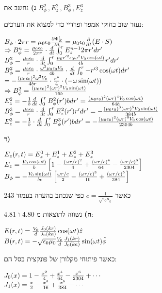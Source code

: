 \documentclass[14pt]{extarticle}
\makeatletter
\newenvironment{lefteqs}{%
    \begin{english}%
    \begin{flushleft}%
    \renewcommand{\arraystretch}{1.3}%
    $\begin{array}{@{}l@{}}%
}{%
    \end{array}$%
    \end{flushleft}%
    \end{english}%
}
\makeatother
\begin{document}
\textbf{ג)} 
נחשב את $B_\phi^2 \, , E_z^2 \, , B_\phi^3 \, , E_z^3$

נעזר שוב בחוקי אמפר ופרדיי כדי למצוא את הערכים:

\begin{lefteqs}
    B_\phi \cdot 2\pi r = \mu_0 \epsilon_0 \frac{\partial \Phi_E^1}{\partial t} = \mu_0 \epsilon_0 \frac{\partial}{\partial  t} (E \cdot S) \\
    \Rightarrow B_\phi^n = \frac{\mu_0 \epsilon_0}{2\pi r} \cdot \frac{d}{dt} \int_0^r E_z^{n-1} 2\pi r' dr' \\
    B_\phi^2 = \frac{\mu_0 \epsilon_0}{r} \cdot \frac{d}{dt} \int_0^r \frac{\mu_0 r'^2 \epsilon_0 \omega^2 V_0 \cos(\omega t)}{4b} r' dr' \\
    B_\phi^2 = \frac{\mu_0 \epsilon_0}{r} \cdot \frac{\omega^2 \mu_0 \epsilon_0 V_0}{4b} \cdot \frac{d}{dt} \int_0^r -r'^3 \cos(\omega t) dr' \\
    = -\frac{(\mu_0 \epsilon_0)^2 \omega^2 V_0}{4b r} \cdot \frac{r^4}{4} \cdot (-\omega \sin(\omega t)) \\
    \Rightarrow B_\phi^2 =\frac{(\mu_0 \epsilon_0)^2 (\omega r)^3 V_0 \sin(\omega t)}{16b} \\
    E_z^2 = -\frac{1}{b} \frac{d}{dt} \int_0^r B_\phi^2(r') b dr' = \frac{(\mu_0 \epsilon_0)^2 (\omega r)^4 V_0 \cos(\omega t)}{64b} \\
    B_\phi^3 = \frac{\mu_0 \epsilon_0}{r} \cdot \frac{d}{dt} \int_0^r E_z^2(r') r' dr' = -\frac{(\mu_0 \epsilon_0)^3 (\omega r)^5 V_0 \sin(\omega t)}{384b} \\
    E_z^3 = -\frac{1}{b} \cdot \frac{d}{dt} \int_0^r B_\phi^3(r') b dr' = -\frac{(\mu_0 \epsilon_0)^3 (\omega r)^6 V_0 \cos(\omega t)}{2304b}
\end{lefteqs}

\textbf{ד)} 
\begin{lefteqs}
    E_z(r,t) = E_z^0 + E_z^1 + E_z^2 + E_z^3 \\
    E_z = \frac{V_0 \cos(\omega t)}{b} \left[1 - \frac{(\omega r / c)^2}{4} + \frac{(\omega r / c)^4}{64} - \frac{(\omega r / c)^6}{2304}\right] \\
    B_\phi = -\frac{V_0 \sin(\omega t)}{b c} \left[ \frac{\omega r / c}{2} - \frac{(\omega r / c)^3}{16} + \frac{(\omega r / c)^5}{384} \right]
\end{lefteqs}
כאשר $c = \frac{1}{\sqrt{\epsilon_0 \mu_0}}$ כפי שנכתב בהערה בעמוד 243

\textbf{ה)} 
נשווה לתוצאות מ 4.80 ו 4.81:
\begin{lefteqs}
    E(r,t) =  \frac{V_0}{d} \frac{J_0(kr)}{J_0(ka)} \cos(\omega t) \hat{z} \\
    B(r,t) = -\sqrt{\epsilon_0 \mu_0} \frac{V_0}{d} \frac{J_1(kr)}{J_0(ka)} \sin(\omega t) \hat{\phi}
\end{lefteqs}
כאשר פיתוחי מקלורן של פונקצית בסל הם:
\begin{lefteqs}
    J_0(x) = 1 - \frac{x^2}{4} + \frac{x^4}{64} - \frac{x^6}{2304} + \cdots \\
    J_1(x) = \frac{x}{2} - \frac{x^3}{16} + \frac{x^5}{384} - \cdots
\end{lefteqs}
\end{document}
